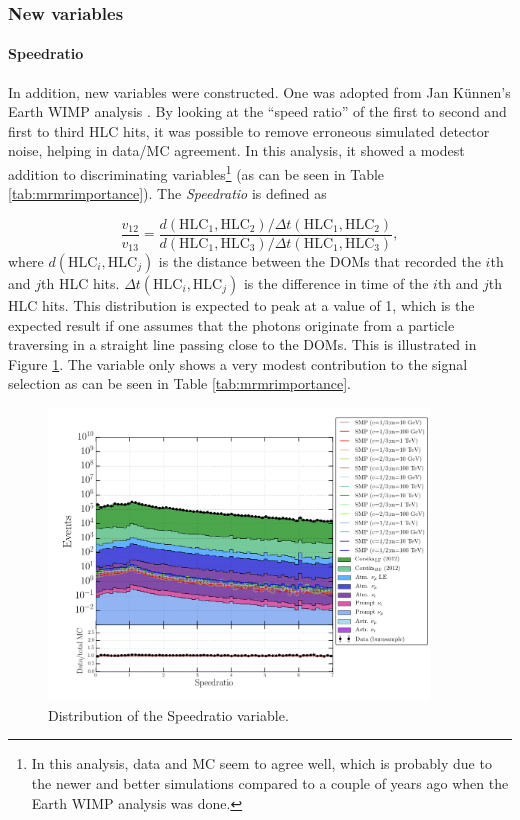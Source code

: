\subsubsection{New variables}

\paragraph{Speedratio}
In addition, new variables were constructed. One was adopted from Jan K\"unnen's Earth WIMP analysis \cite{kunnenthesis}. By looking at the ``speed ratio'' of the first to second and first to third HLC hits, it was possible to remove erroneous simulated detector noise, helping in data/MC agreement. In this analysis, it showed a modest addition to discriminating variables\footnote{In this analysis, data and MC seem to agree well, which is probably due to the newer and better simulations compared to a couple of years ago when the Earth WIMP analysis was done.} (as can be seen in Table \ref{tab:mrmrimportance}).  The \textit{Speedratio} is defined as

\begin{equation}
\frac{v_{12}}{v_{13}} = \frac{d\left( \textrm{HLC}_1,\textrm{HLC}_2 \right)/\Delta t\left(\textrm{HLC}_1, \textrm{HLC}_2\right)}{d\left(\textrm{HLC}_1, \textrm{HLC}_3 \right)/\Delta t\left(\textrm{HLC}_1,\textrm{HLC}_3 \right)},
\end{equation}
where $d\left( \textrm{HLC}_i,\textrm{HLC}_j \right)$ is the distance between the DOMs that recorded the $i$th and $j$th HLC hits. $\Delta t\left(\textrm{HLC}_i, \textrm{HLC}_j\right)$ is the difference in time of the $i$th and $j$th HLC hits. This distribution is expected to peak at a value of 1, which is the expected result if one assumes that the photons originate from a particle traversing in a straight line passing close to the DOMs. This is illustrated in Figure \ref{fig:newvariables1}. The variable only shows a very modest contribution to the signal selection as can be seen in Table \ref{tab:mrmrimportance}.

\begin{figure}
\centering
\includegraphics[width=0.9\textwidth]{chapter8/img/1D_stack_speedratio.png}
\caption{Distribution of the Speedratio variable.}
\label{fig:newvariables1}
\end{figure}


